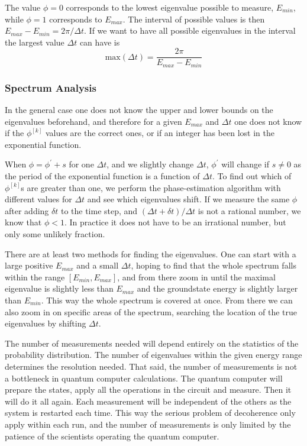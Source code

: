 The value $\phi=0$ corresponds to the lowest eigenvalue possible to measure,
$E_{min}$, while $\phi=1$ corresponds to $E_{max}$. The interval of
possible values is then $E_{max}-E_{min} = 2\pi/\Delta t$. If we want to
have all possible eigenvalues in the interval the largest value
$\Delta t$ can have is 
\begin{equation}
\mathrm{max}(\Delta t) = \frac{2\pi}{E_{max}-E_{min}}
\end{equation}



\subsubsection{Spectrum Analysis}

In the general case one does not know the upper and lower bounds on
the eigenvalues beforehand, and therefore for a given $E_{max}$ and
$\Delta t$ one does not know if the $\phi^{[k]}$ values are the correct
ones, or if an integer has been lost in the exponential function.

When $\phi=\phi^\prime +s$ for one
$\Delta t$, and we slightly change $\Delta t$, $\phi^\prime$ will
change if $s\neq 0$ 
as the period of the exponential function is a function of
$\Delta t$. 
To find out which of $\phi^{[k]}$s are greater than
one, we perform the phase-estimation algorithm with different values for $\Delta
t$ and 
see which eigenvalues shift. 
If we measure the same $\phi$ after adding $\delta t$ to
the time step, and $(\Delta t + \delta t)/\Delta t$ is not a rational
number, we know that $\phi <1$. In practice it does not have to be an
irrational number, but only some unlikely fraction.

There are at least two
methods for finding the eigenvalues. One can start with a
large positive $E_{max}$ and a small $\Delta t$, hoping to find that
the whole spectrum falls within the range $[E_{min}, E_{max}]$, and
from there zoom in until the maximal eigenvalue is slightly less than
$E_{max}$ and the groundstate energy is slightly larger than
$E_{min}$. This way the whole spectrum is covered at once.
From there we can also zoom in on specific areas of the spectrum,
searching  the location of the true eigenvalues by shifting $\Delta t$. 

The number of measurements needed will depend entirely on the
statistics of the probability distribution. The number of eigenvalues
within the given energy range determines the resolution needed. 
That said, the number of
measurements is not a bottleneck in quantum computer calculations. The
quantum computer will prepare the states, apply all the operations
in the circuit and measure. Then it will do it all again. Each
measurement will be independent of the others as the system is
restarted each time. This way the serious problem of decoherence only
apply within each run, and the number of measurements is only
limited by the patience of the scientists operating the quantum
computer. 




